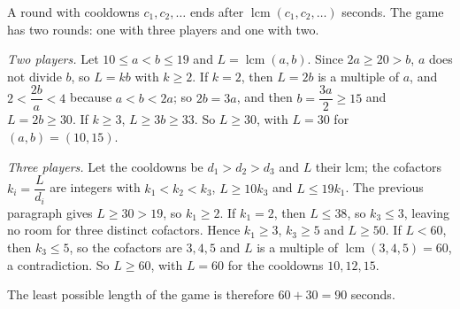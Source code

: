 A round with cooldowns $c_1,c_2,\dots$ ends after $\operatorname{lcm}(c_1,c_2,\dots)$ seconds. The game has two rounds: one with three players and one with two.

\emph{Two players.} Let $10\le a<b\le19$ and $L=\operatorname{lcm}(a,b)$. Since $2a\ge20>b$, $a$ does not divide $b$, so $L=kb$ with $k\ge2$. If $k=2$, then $L=2b$ is a multiple of $a$, and $2<\dfrac{2b}{a}<4$ because $a<b<2a$; so $2b=3a$, and then $b=\dfrac{3a}{2}\ge15$ and $L=2b\ge30$. If $k\ge3$, $L\ge3b\ge33$. So $L\ge30$, with $L=30$ for $(a,b)=(10,15)$.

\emph{Three players.} Let the cooldowns be $d_1>d_2>d_3$ and $L$ their lcm; the cofactors $k_i=\dfrac{L}{d_i}$ are integers with $k_1<k_2<k_3$, $L\ge10k_3$ and $L\le19k_1$. The previous paragraph gives $L\ge30>19$, so $k_1\ge2$. If $k_1=2$, then $L\le38$, so $k_3\le3$, leaving no room for three distinct cofactors. Hence $k_1\ge3$, $k_3\ge5$ and $L\ge50$. If $L<60$, then $k_3\le5$, so the cofactors are $3,4,5$ and $L$ is a multiple of $\operatorname{lcm}(3,4,5)=60$, a contradiction. So $L\ge60$, with $L=60$ for the cooldowns $10,12,15$.

The least possible length of the game is therefore $60+30=\boxed{90}$ seconds.
